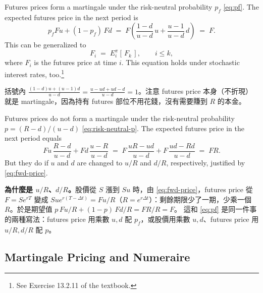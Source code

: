 
Futures prices form a martingale under the risk-neutral probability $p_{f}$ \eqref{eq:pf}.
The expected futures price in the next period is
\[
	p_{f}Fu+(1-p_{f})\,Fd \;=\; F\left(\frac{1-d}{u-d}\,u+\frac{u-1}{u-d}\,d\right) \;=\; F .
\]
This can be generalized to
\[
	F_{i} \;=\; E_{i}^{\pi}[\,F_{k}\,] , \qquad i\le k ,
\]
where $F_{i}$ is the futures price at time $i$.
This equation holds under stochastic interest rates, too.\footnote{See Exercise 13.2.11 of the textbook.}

\suppstart
{}

\begin{remark}
	括號內 $\frac{(1-d)u+(u-1)d}{u-d}=\frac{u-ud+ud-d}{u-d}=1$。注意 futures price 本身（不折現）就是 martingale，因為持有 futures 部位不用花錢，沒有需要賺到 $R$ 的本金。
\end{remark}
\suppend

Futures prices do not form a martingale under the risk-neutral probability $p=(R-d)/(u-d)$ \eqref{eq:risk-neutral-p}.
The expected futures price in the next period equals
\[
	Fu\,\frac{R-d}{u-d}+Fd\,\frac{u-R}{u-d}
	\;=\; F\,\frac{uR-ud}{u-d}+F\,\frac{ud-Rd}{u-d}
	\;=\; FR .
\]
But they do if $u$ and $d$ are changed to $u/R$ and $d/R$, respectively, justified by \eqref{eq:fwd-price}.

\suppstart
{}

\begin{remark}
	\textbf{為什麼是 $u/R$、$d/R$。}股價從 $S$ 漲到 $Su$ 時，由 \eqref{eq:fwd-price}，futures price 從 $F=Se^{rT}$ 變成 $Sue^{r(T-\Delta t)}=Fu/R$（$R=e^{r\Delta t}$）：剩餘期限少了一期，少乘一個 $R$。於是期望值 $p\,Fu/R+(1-p)\,Fd/R=FR/R=F$。
	這和 \eqref{eq:pf} 是同一件事的兩種寫法：futures price 用乘數 $u,d$ 配 $p_{f}$，或股價用乘數 $u,d$、futures price 用 $u/R,d/R$ 配 $p$。
\end{remark}
\suppend

\subsection{Martingale Pricing and Numeraire}
\label{sec:numeraire}

